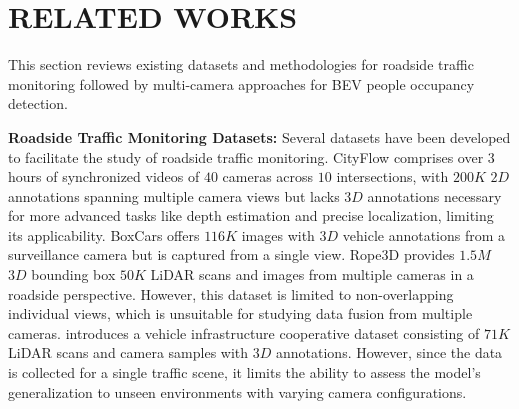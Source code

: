 \section{RELATED WORKS}
\label{sec:related_works}
This section reviews existing datasets and methodologies for roadside traffic monitoring followed by multi-camera approaches for BEV people occupancy detection.

\textbf{Roadside Traffic Monitoring Datasets:} Several datasets have been developed to facilitate the study of roadside traffic monitoring. CityFlow \cite{tang2019cityflow} comprises over $3$ hours of synchronized videos of $40$ cameras across $10$ intersections, with $200K$ $2D$ annotations spanning multiple camera views but lacks $3D$ annotations necessary for more advanced tasks like depth estimation and precise localization, limiting its applicability. BoxCars \cite{sochor2018boxcars} offers $116K$ images with $3D$ vehicle annotations from a surveillance camera but is captured from a single view. Rope3D \cite{ye2022rope3d} provides $1.5M$ $3D$ bounding box $50K$ LiDAR scans and images from multiple cameras in a roadside perspective. However, this dataset is limited to non-overlapping individual views, which is unsuitable for studying data fusion from multiple cameras. \cite{yu2022dair} introduces a vehicle infrastructure cooperative dataset consisting of $71K$ LiDAR scans and camera samples with $3D$ annotations. However, since the data is collected for a single traffic scene, it limits the ability to assess the model's generalization to unseen environments with varying camera configurations.

